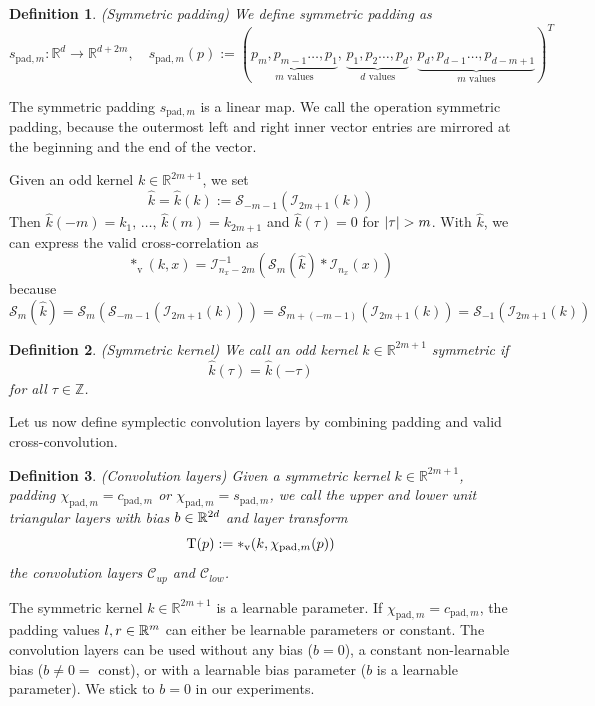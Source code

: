 \documentclass[twoside,a4paper]{article}
\newtheorem{definition}{Definition}
\begin{document}
\begin{definition}
	(Symmetric padding)
	We define symmetric padding as
	\begin{equation*}
		s_{\text{pad},m} : \mathbb{R}^d \to \mathbb{R}^{d+2m},
		\quad s_{\text{pad},m}(p) := (
			\underbrace{p_m, p_{m-1} \dots, p_1}_{m \text{ values}}, \,
			\underbrace{p_1, p_2 \dots, p_d}_{d \text{ values}}, \,
			\underbrace{p_d, p_{d-1} \dots, p_{d-m+1}}_{m \text{ values}}
		)^T
	\end{equation*}
\end{definition}
The symmetric padding $s_{\text{pad},m}$ is a linear map. We call the operation symmetric padding,
because the outermost left and right inner vector entries are mirrored at the beginning and the end
of the vector.

Given an odd kernel $k \in \mathbb{R}^{2m+1}$, we set
\begin{equation*}
	\hat{k} = \hat{k}(k) := \mathcal{S}_{-m-1}(\mathcal{I}_{2m+1}(k))
\end{equation*}
Then $\hat{k}(-m) = k_1, \, \dots,\, \hat{k}(m) = k_{2m+1}$ and
$\hat{k}(\tau)=0$ for $\left|{\tau}\right| > m$. With $\hat{k}$, we can express the valid cross-correlation as
\begin{equation*}
	*_{\text{v}}(k,x) = \mathcal{I}_{n_x-2m}^{-1} (
		\mathcal{S}_{m}(\hat{k}) * \mathcal{I}_{n_x}(x)
	)
\end{equation*}
because
\begin{equation*}
	\mathcal{S}_{m}(\hat{k}) 
	= \mathcal{S}_{m}(\mathcal{S}_{-m-1}(\mathcal{I}_{2m+1}(k)))
	= \mathcal{S}_{m+(-m-1)}(\mathcal{I}_{2m+1}(k))
	= \mathcal{S}_{-1}(\mathcal{I}_{2m+1}(k))
\end{equation*}

\begin{definition}
	(Symmetric kernel)
	We call an odd kernel $k \in \mathbb{R}^{2m+1}$ symmetric if
	\begin{equation*}
		\hat{k}(\tau) = \hat{k}(-\tau)
	\end{equation*}
	for all $\tau \in \mathbb{Z}$.
\end{definition}

Let us now define symplectic convolution layers by combining padding and valid 
cross-convolution.
\begin{definition}
	(Convolution layers)
	Given a symmetric kernel $k \in \mathbb{R}^{2m+1}$, padding
	$\chi_{\text{pad},m} = c_{\text{pad},m}$ or $\chi_{\text{pad},m} = s_{\text{pad},m}$,
	we call the upper and lower unit triangular layers with bias $b \in \mathbb{R}^{2d}$ and layer transform
	\begin{equation*}
		\mathrm{T}(p) := *_{\text{v}}(k,\chi_{\text{pad},m}(p))
	\end{equation*}
	the convolution layers $\mathcal{C}_{up}$ and $\mathcal{C}_{low}$.
\end{definition}
The symmetric kernel $k \in \mathbb{R}^{2m+1}$ is a learnable parameter.
If $\chi_{\text{pad},m} = c_{\text{pad},m}$, the padding values $l,r \in \mathbb{R}^m$ can either
be learnable parameters or constant. The convolution layers can be used without any bias ($b=0$), a
constant non-learnable bias ($b \neq 0 =$ const), or with a learnable bias parameter 
($b$ is a learnable parameter). We stick to $b=0$ in our experiments.
\end{document}
